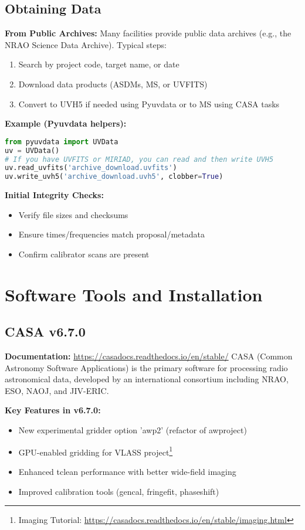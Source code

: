 \documentclass[11pt]{article}
\begin{document}
\subsection{Obtaining Data}
\textbf{From Public Archives:} Many facilities provide public data archives (e.g., the NRAO Science Data Archive). Typical steps:
\begin{enumerate}
    \item Search by project code, target name, or date
    \item Download data products (ASDMs, MS, or UVFITS)
    \item Convert to UVH5 if needed using Pyuvdata or to MS using CASA tasks
\end{enumerate}
\textbf{Example (Pyuvdata helpers):}
\begin{lstlisting}[language=Python]
from pyuvdata import UVData
uv = UVData()
# If you have UVFITS or MIRIAD, you can read and then write UVH5
uv.read_uvfits('archive_download.uvfits')
uv.write_uvh5('archive_download.uvh5', clobber=True)
\end{lstlisting}
\textbf{Initial Integrity Checks:}
\begin{itemize}
    \item Verify file sizes and checksums
    \item Ensure times/frequencies match proposal/metadata
    \item Confirm calibrator scans are present
\end{itemize}

\section{Software Tools and Installation}

\subsection{CASA v6.7.0}
\textbf{Documentation:} \url{https://casadocs.readthedocs.io/en/stable/}
CASA (Common Astronomy Software Applications) is the primary software for processing radio astronomical data, developed by an international consortium including NRAO, ESO, NAOJ, and JIV-ERIC.

\textbf{Key Features in v6.7.0:}
\begin{itemize}
    \item New experimental gridder option 'awp2' (refactor of awproject)
    \item GPU-enabled gridding for VLASS project\footnote{Imaging Tutorial: \url{https://casadocs.readthedocs.io/en/stable/imaging.html}}
    \item Enhanced tclean performance with better wide-field imaging
    \item Improved calibration tools (gencal, fringefit, phaseshift)
\end{itemize}
\end{document}
